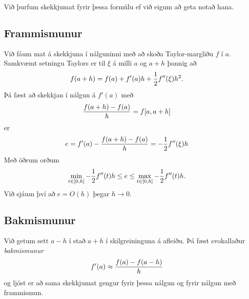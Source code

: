 \documentclass[A4paper,10pt,icelandic]{sphinxmanual}
\begin{document}
Við þurfum skekkjumat fyrir þessa formúlu ef við eigum að geta notað
hana.


\subsection{Frammismunur}
\label{kafli04:frammismunur}
Við fáum mat á skekkjuna í nálguninni með að skoða Taylor-margliðu
\(f\) í \(a\). Samkvæmt setningu Taylors er til \(\xi\) á
milli \(a\) og \(a+h\) þannig að
\begin{gather}
\begin{split}f(a+h) = f(a) + f'(a)h + \frac{1}{2} f''(\xi)h^2.\end{split}\notag
\end{gather}
Þá fæst að skekkjan í nálgun á \(f'(a)\) með
\begin{gather}
\begin{split}\frac{f(a+h)-f(a)}{h} = f[a,a+h]\end{split}\notag
\end{gather}
er
\begin{gather}
\begin{split}e = f'(a) - \frac{f(a+h)-f(a)}{h} = -\frac{1}{2} f''(\xi) h\end{split}\notag
\end{gather}
Með öðrum orðum
\begin{gather}
\begin{split}\min_{t\in [0,h]} -\frac 12 f''(t)h \leq e \leq
\max_{t\in [0,h]} -\frac 12 f''(t)h.\end{split}\notag
\end{gather}
Við sjáum því að \(e=O(h)\) þegar \(h \to 0\).


\subsection{Bakmismunur}
\label{kafli04:bakmismunur}\label{kafli04:index-2}
Við getum sett \(a-h\) í stað \(a+h\) í skilgreininguna á
afleiðu. Þá fæst svokallaður \emph{bakmismunur}
\begin{gather}
\begin{split}f'(a) \approx \frac{f(a)-f(a-h)}{h}\end{split}\notag
\end{gather}
og ljóst er að sama skekkjumat gengur fyrir þessa nálgun og fyrir nálgun
með frammismun.

\end{document}
